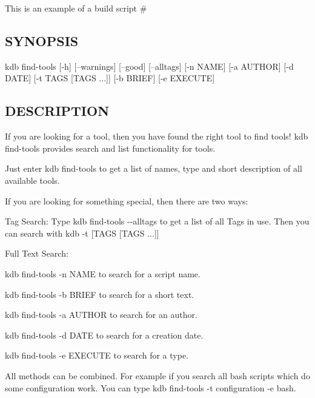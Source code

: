 This is an example of a build script \#

\subsection*{S\+Y\+N\+O\+P\+S\+IS}


\begin{DoxyCode}
kdb find-tools [-h] [--warnings] [--good] [--alltags] [-n NAME] [-a AUTHOR] [-d DATE]
               [-t TAGS [TAGS ...]] [-b BRIEF] [-e EXECUTE]
\end{DoxyCode}


\subsection*{D\+E\+S\+C\+R\+I\+P\+T\+I\+ON}

If you are looking for a tool, then you have found the right tool to find tools! {\ttfamily kdb find-\/tools} provides search and list functionality for tools.

Just enter {\ttfamily kdb find-\/tools} to get a list of names, type and short description of all available tools.

If you are looking for something special, then there are two ways\+:


\begin{DoxyEnumerate}
\item Tag Search\+: Type {\ttfamily kdb find-\/tools -\/-\/alltags} to get a list of all Tags in use. Then you can search with {\ttfamily kdb -\/t \mbox{[}T\+A\+GS \mbox{[}T\+A\+GS ...\mbox{]}\mbox{]}}
\item Full Text Search\+:
\begin{DoxyItemize}
\item {\ttfamily kdb find-\/tools -\/n N\+A\+ME} to search for a script name.
\item {\ttfamily kdb find-\/tools -\/b B\+R\+I\+EF} to search for a short text.
\item {\ttfamily kdb find-\/tools -\/a A\+U\+T\+H\+OR} to search for an author.
\item {\ttfamily kdb find-\/tools -\/d D\+A\+TE} to search for a creation date.
\item {\ttfamily kdb find-\/tools -\/e E\+X\+E\+C\+U\+TE} to search for a type.
\end{DoxyItemize}
\end{DoxyEnumerate}

All methods can be combined. For example if you search all bash scripts which do some configuration work. You can type {\ttfamily kdb find-\/tools -\/t configuration -\/e bash}.

